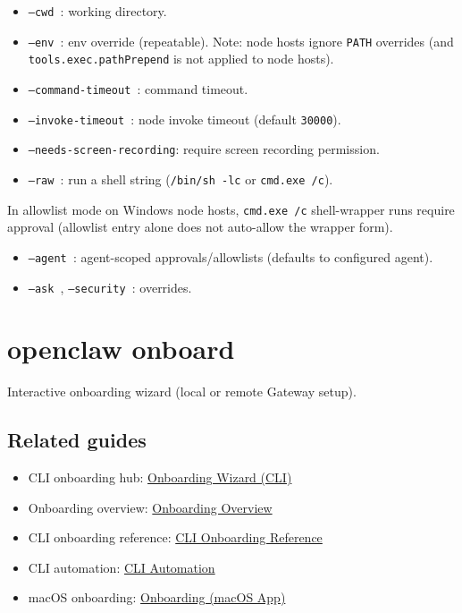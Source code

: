 \begin{itemize}
  \item \texttt{--cwd }: working directory.
  \item \texttt{--env }: env override (repeatable). Note: node hosts ignore \texttt{PATH} overrides (and \texttt{tools.exec.pathPrepend} is not applied to node hosts).
  \item \texttt{--command-timeout }: command timeout.
  \item \texttt{--invoke-timeout }: node invoke timeout (default \texttt{30000}).
  \item \texttt{--needs-screen-recording}: require screen recording permission.
  \item \texttt{--raw }: run a shell string (\texttt{/bin/sh -lc} or \texttt{cmd.exe /c}).
\end{itemize}

In allowlist mode on Windows node hosts, \texttt{cmd.exe /c} shell-wrapper runs require approval
(allowlist entry alone does not auto-allow the wrapper form).
\begin{itemize}
  \item \texttt{--agent }: agent-scoped approvals/allowlists (defaults to configured agent).
  \item \texttt{--ask }, \texttt{--security }: overrides.
\end{itemize}



\clearpage

\section{openclaw onboard}


Interactive onboarding wizard (local or remote Gateway setup).

\subsection{Related guides}


\begin{itemize}
  \item CLI onboarding hub: \href{/start/wizard}{Onboarding Wizard (CLI)}
  \item Onboarding overview: \href{/start/onboarding-overview}{Onboarding Overview}
  \item CLI onboarding reference: \href{/start/wizard-cli-reference}{CLI Onboarding Reference}
  \item CLI automation: \href{/start/wizard-cli-automation}{CLI Automation}
  \item macOS onboarding: \href{/start/onboarding}{Onboarding (macOS App)}
\end{itemize}


